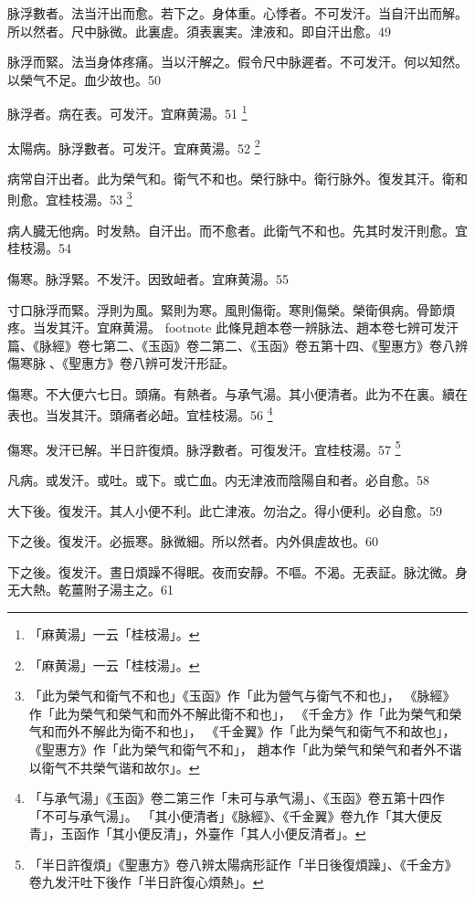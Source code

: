 脉浮數者。法当汗出而愈。若下之。身体重。心悸者。不可发汗。当自汗出而解。所以然者。尺中脉微。此裏虗。須表裏実。津液和。即自汗出愈。49

脉浮而緊。法当身体疼痛。当以汗解之。假令尺中脉遲者。不可发汗。何以知然。以榮气不足。血少故也。50

脉浮者。病在表。可发汗。宜麻黄湯。51
	\footnote{
		「麻黄湯」一云「桂枝湯」。
	}

{\khaaitp 太陽病。}脉浮數者。可发汗。宜麻黄湯。52
	\footnote{
		「麻黄湯」一云「桂枝湯」。
	}

病常自汗出者。此为榮气和。衛气不和也。榮行脉中。衛行脉外。復发其汗。衛和則愈。宜桂枝湯。53
	\footnote{
		「此为榮气和衛气不和也」《玉函》作「此为營气与衛气不和也」，
		《脉經》作「此为榮气和榮气和而外不解此衛不和也」，
		《千金方》作「此为榮气和榮气和而外不解此为衛不和也」，
		《千金翼》作「此为榮气和衛气不和故也」，
		《聖惠方》作「此为榮气和衛气不和」，
		趙本作「此为榮气和榮气和者外不谐以衛气不共榮气谐和故尔」。
	}

病人臓无他病。时发熱。自汗出。而不愈者。此衛气不和也。先其时发汗則愈。宜桂枝湯。54

傷寒。脉浮緊。不发汗。因致衄者。宜麻黄湯。55

{\khaaitp 寸口}脉浮而緊。浮則为風。緊則为寒。風則傷衛。寒則傷榮。榮衛俱病。骨節煩疼。当发其汗。{\khaaitp 宜麻黄湯。}
	footnote{
		此條見趙本卷一辨脉法、趙本卷七辨可发汗篇、《脉經》卷七第二、《玉函》卷二第二、《玉函》卷五第十四、《聖惠方》卷八辨傷寒脉{\sungtpii 𠊱}、《聖惠方》卷八辨可发汗形証。
	}

傷寒。不大便六七日。頭痛。有熱者。与承气湯。其小便清者。此为不在裏。續在表也。当发其汗。頭痛者必衄。宜桂枝湯。56
	\footnote{
		「与承气湯」《玉函》卷二第三作「未可与承气湯」、《玉函》卷五第十四作「不可与承气湯」。
		「其小便清者」《脉經》、《千金翼》卷九作「其大便反青」，玉函作「其小便反清」，外臺作「其人小便反清者」。
	}

傷寒。发汗已解。半日許復煩。脉浮數者。可復发汗。宜桂枝湯。57
	\footnote{
		「半日許復煩」《聖惠方》卷八辨太陽病形証作「半日後復煩躁」、《千金方》卷九发汗吐下後作「半日許復心煩熱」。
	}

凡病。或发汗。或吐。或下。或亡血。{\khaaitp 内}无津液而陰陽自和者。必自愈。58

大下後。復发汗。其人小便不利。此亡津液。勿治之。得小便利。必自愈。59

下之後。復发汗。必振寒。脉微細。所以然者。内外俱虗故也。60

下之後。復发汗。晝日煩躁不得眠。夜而安靜。不嘔。不渴。无表証。脉沈微。身无大熱。乾薑附子湯主之。61

